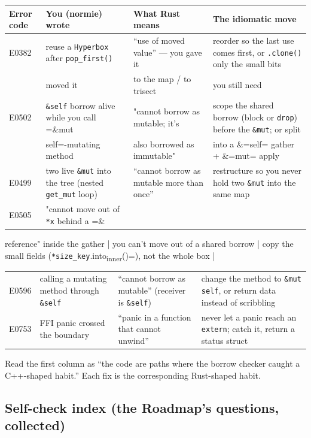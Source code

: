 \documentclass[11pt]{article}
\begin{document}
\begin{center}
\begin{tabular}{llll}
Error code & You (normie) wrote & What Rust means & The idiomatic move\\
\hline
E0382 & reuse a \texttt{Hyperbox} after \texttt{pop\_first()} & ``use of moved value'' — you gave it & reorder so the last use comes first, or \texttt{.clone()} only the small bits\\
 & moved it & to the map / to trisect & you still need\\
E0502 & \texttt{\&self} borrow alive while you call =\&mut & "cannot borrow as mutable; it's & scope the shared borrow (block or \texttt{drop}) before the \texttt{\&mut}; or split\\
 & self=-mutating method & also borrowed as immutable" & into a \&=self= gather + \&=mut= apply\\
E0499 & two live \texttt{\&mut} into the tree (nested \texttt{get\_mut} loop) & ``cannot borrow as mutable more than once'' & restructure so you never hold two \texttt{\&mut} into the same map\\
E0505 & "cannot move out of \texttt{*x} behind a =\&\\
\end{tabular}
\end{center}
reference" inside the gather                 | you can't move out of a shared
borrow                          | copy the small fields (\texttt{*size\_key}.into\textsubscript{inner}()=), not the whole box   |
\begin{center}
\begin{tabular}{llll}
E0596 & calling a mutating method through \texttt{\&self} & ``cannot borrow as mutable'' (receiver is \texttt{\&self}) & change the method to \texttt{\&mut self}, or return data instead of scribbling\\
E0753 & FFI panic crossed the boundary & ``panic in a function that cannot unwind'' & never let a panic reach an \texttt{extern}; catch it, return a status struct\\
\end{tabular}
\end{center}

Read the first column as ``the code are paths where the borrow checker caught a
C++-shaped habit.'' Each fix is the corresponding Rust-shaped habit.
\subsection{Self-check index (the Roadmap's questions, collected)}
\label{sec:orge893455}
\end{document}
